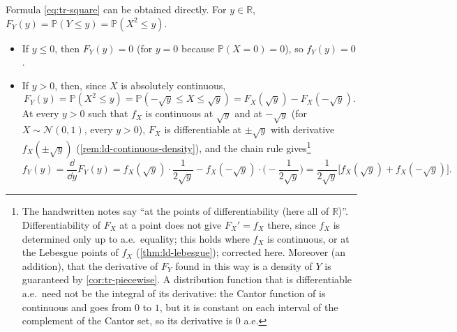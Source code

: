 \begin{remark}\label{rem:tr-square-direct}
Formula \eqref{eq:tr-square} can be obtained directly. For $y\in\mathbb R$,
$F_Y(y)=\mathbb P(Y\le y)=\mathbb P(X^2\le y)$.
\begin{itemize}
  \item If $y\le0$, then $F_Y(y)=0$ (for $y=0$ because $\mathbb P(X=0)=0$), so $f_Y(y)=0$.
  \item If $y>0$, then, since $X$ is absolutely continuous,
    \[
      F_Y(y)=\mathbb P(X^2\le y)=\mathbb P(-\sqrt y\le X\le\sqrt y)=F_X(\sqrt y)-F_X(-\sqrt y).
    \]
    At every $y>0$ such that $f_X$ is continuous at $\sqrt y$ and at $-\sqrt y$ (for
    $X\sim\mathcal N(0,1)$, every $y>0$), $F_X$ is differentiable at $\pm\sqrt y$ with derivative
    $f_X(\pm\sqrt y)$ (\cref{rem:ld-continuous-density}), and the chain rule
    gives\footnote{The handwritten notes say ``at the points of differentiability (here all of
    $\mathbb R$)''. Differentiability of $F_X$ at a point does not give $F_X'=f_X$ there, since
    $f_X$ is determined only up to a.e.\ equality; this holds where $f_X$ is continuous, or at the
    Lebesgue points of $f_X$ (\cref{thm:ld-lebesgue}); corrected here. Moreover (an addition),
    that the derivative of $F_Y$ found in this way is a density of $Y$ is guaranteed by
    \cref{cor:tr-piecewise}. A distribution
    function that is differentiable a.e.\ need not be the integral of its derivative: the Cantor
    function of  is continuous and goes from $0$ to $1$, but it is
    constant on each interval of the complement of the Cantor set, so its derivative is $0$ a.e.}
    \[
      f_Y(y)=\frac{\dd}{\dd y}F_Y(y)=f_X(\sqrt y)\cdot\frac1{2\sqrt y}-f_X(-\sqrt y)\cdot\Big(-\frac1{2\sqrt y}\Big)
      =\frac1{2\sqrt y}\Big[f_X(\sqrt y)+f_X(-\sqrt y)\Big].
    \]
\end{itemize}
\end{remark}

